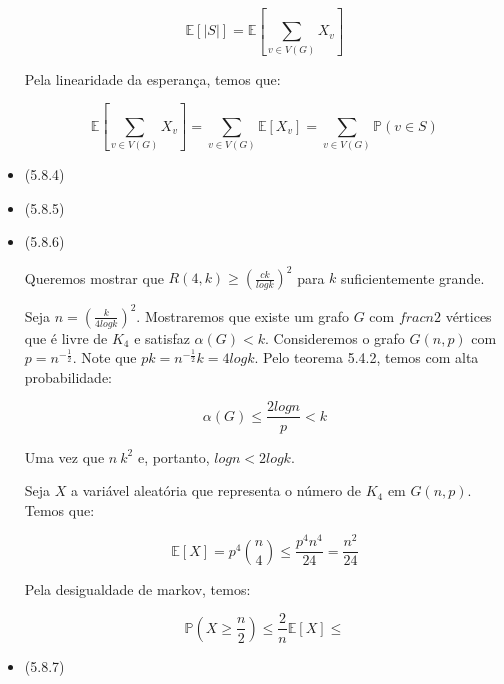 \documentclass{article}
\begin{document}
\begin{itemize}
	      \[\mathbb{E}[|S|] = \mathbb{E}[\sum_{v \in V(G)} X_v]\]

	      Pela linearidade da esperança, temos que:

	      \[\mathbb{E}[\sum_{v \in V(G)} X_v] = \sum_{v \in V(G)} \mathbb{E}[X_v] = \sum_{v \in V(G)} \mathbb{P}(v \in S)\]

	\item (5.8.4)
	\item (5.8.5)
	\item (5.8.6)

	      Queremos mostrar que \(R(4, k) \geq (\frac{ck}{log k})^2\) para \(k\) suficientemente grande.

	      Seja \(n = (\frac{k}{4 log k})^2\). Mostraremos que existe um grafo \(G\) com \(frac{n}{2}\) vértices que é livre de \(K_4\) e satisfaz \(\alpha(G) < k\).
	      Consideremos o grafo \(G(n,p)\) com \(p = n^{-\frac{1}{2}}\). Note que \(pk = n^{-\frac{1}{2}}k = 4 log k\). Pelo teorema 5.4.2, temos com alta probabilidade:

	      \[\alpha(G) \leq \frac{2 log n}{p} < k\]

	      Uma vez que \(n \ k^2\) e, portanto, \(log n < 2 log k\).

	      Seja \(X\) a variável aleatória que representa o número de \(K_4\) em \(G(n, p)\). Temos que:

	      \[\mathbb{E}[X] = p^4 \binom{n}{4} \leq \frac{p^4 n^4}{24} = \frac{n^2}{24}\]

	      Pela desigualdade de markov, temos:

	      \[\mathbb{P}(X \geq \frac{n}{2}) \leq \frac{2}{n}\mathbb{E}[X] \leq \]


	\item (5.8.7)
\end{itemize}
\end{document}
